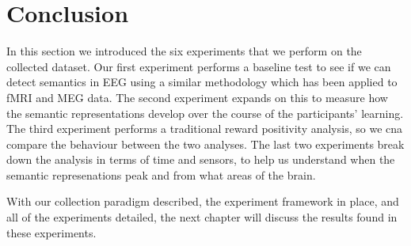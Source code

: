 \section{Conclusion}
In this section we introduced the six experiments that we perform on the 
collected dataset. Our first experiment performs a baseline test to see if we 
can detect semantics in EEG using a similar methodology which has been applied 
to fMRI and MEG data. The second experiment expands on this to measure how the 
semantic representations develop over the course of the participants' learning.  
The third experiment performs a traditional reward positivity analysis, so we 
cna compare the behaviour between the two analyses. The last two experiments 
break down the analysis in terms of time and sensors, to help us understand 
when the semantic represenations peak and from what areas of the brain.

With our collection paradigm described, the experiment framework in place, and 
all of the experiments detailed, the next chapter will discuss the results 
found in these experiments.
